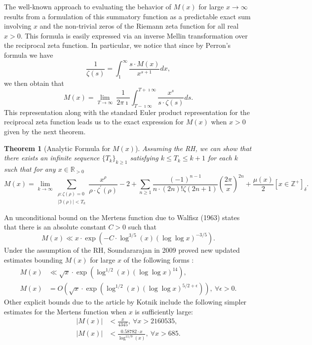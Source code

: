\documentclass[11pt,reqno,a4letter]{article}
\numberwithin{figure}{section}
\numberwithin{table}{section}
\newcommand{\Iverson}[1]{\ensuremath{\left[#1\right]_{\delta}}}
\theoremstyle{plain}
\newtheorem{theorem}{Theorem}
\numberwithin{theorem}{section}
\theoremstyle{definition}
\begin{document}
The well-known approach to evaluating the behavior of $M(x)$ for large 
$x \rightarrow \infty$ results from a formulation of this summatory 
function as a predictable exact sum involving $x$ and the non-trivial 
zeros of the Riemann zeta function for all real $x > 0$. 
This formula is easily expressed via an inverse Mellin transformation 
over the reciprocal zeta function. In particular, 
we notice that since by Perron's formula we have 
\[
\frac{1}{\zeta(s)} = \int_1^{\infty} \frac{s \cdot M(x)}{x^{s+1}} dx, 
\]
we then obtain that 
\[
M(x) = \lim_{T \rightarrow \infty}\ \frac{1}{2\pi\imath} \int_{T-\imath\infty}^{T+\imath\infty} 
     \frac{x^s}{s \cdot \zeta(s)} ds. 
\] 
This representation along with the standard Euler product 
representation for the reciprocal zeta function leads us to the 
exact expression for $M(x)$ when $x > 0$ given by the next theorem. 

\begin{theorem}[Analytic Formula for $M(x)$] 
\label{theorem_MxMellinTransformInvFormula} 
Assuming the RH, we can show that there exists an infinite sequence 
$\{T_k\}_{k \geq 1}$ satisfying $k \leq T_k \leq k+1$ for each $k$ 
such that for any $x \in \mathbb{R}_{>0}$ 
\[
M(x) = \lim_{k \rightarrow \infty} 
     \sum_{\substack{\rho: \zeta(\rho) = 0 \\ |\Im(\rho)| < T_k}} 
     \frac{x^{\rho}}{\rho \cdot \zeta^{\prime}(\rho)} - 2 + 
     \sum_{n \geq 1} \frac{(-1)^{n-1}}{n \cdot (2n)! \zeta(2n+1)} 
     \left(\frac{2\pi}{x}\right)^{2n} + 
     \frac{\mu(x)}{2} \Iverson{x \in \mathbb{Z}^{+}}. 
\] 
\end{theorem} 

An unconditional bound on the Mertens function due to Walfisz (1963) 
states that there is an absolute constant $C > 0$ such that 
$$M(x) \ll x \cdot \exp\left(-C \cdot \log^{3/5}(x) 
  (\log\log x)^{-3/5}\right).$$ 
Under the assumption of the RH, Soundararajan in 2009 proved new updated estimates 
bounding $M(x)$ for large $x$ of the following forms \cite{SOUND-MERTENS-ANNALS}: 
\begin{align*} 
M(x) & \ll \sqrt{x} \cdot \exp\left(\log^{1/2}(x) (\log\log x)^{14}\right), \\ 
M(x) & = O\left(\sqrt{x} \cdot \exp\left( 
     \log^{1/2}(x) (\log\log x)^{5/2+\epsilon}\right)\right),\ 
     \forall \epsilon > 0. 
\end{align*} 
Other explicit bounds due to the article by Kotnik include the following 
simpler estimates for the Mertens function when $x$ is sufficiently 
large: 
\begin{align*} 
|M(x)| & < \frac{x}{4345},\ \forall x > 2160535, \\ 
|M(x)| & < \frac{0.58782 \cdot x}{\log^{11/9}(x)},\ \forall x > 685. 
\end{align*} 
\end{document}
